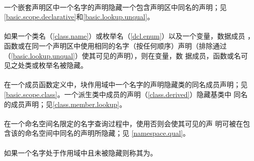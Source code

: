 \paragraph{} %
一个嵌套声明区中一个名字的声明隐藏一个包含声明区中同名的声明；见
\ref{basic.scope.declarative}和\ref{basic.lookup.unqual}。

\paragraph{} %
如果一个类名（\ref{class.name}）或枚举名（\ref{dcl.enum}）以及一个变量，数据成员
，函数或\enumr{}在同一个声明区中使用相同的名字（按任何顺序）声明（排除通过
（\ref{basic.lookup.unqual}）使其可见的声明），则在变量，数
据成员，函数或\enumr{}名可见之处类或枚举名被隐藏。

\paragraph{} %
在一个成员函数定义中，块作用域中一个名字的声明隐藏类的同名成员声明；见
\ref{basic.scope.class}。一个派生类中成员的声明（\ref{class.derived}）隐藏基类中
同名的成员声明；见\ref{class.member.lookup}。

\paragraph{} %
在一个命名空间名限定的名字查询过程中，使用否则会使其可见的声
明可被在包含该的命名空间中同名的声明所隐藏；见
\ref{namespace.qual}。

\paragraph{} %
如果一个名字处于作用域中且未被隐藏则称其为。
